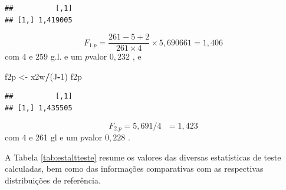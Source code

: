 \documentclass[]{book}
\newenvironment{Shaded}{\begin{snugshade}}{\end{snugshade}}
\newcommand{\DecValTok}[1]{\textcolor[rgb]{0.00,0.00,0.81}{#1}}
\newcommand{\StringTok}[1]{\textcolor[rgb]{0.31,0.60,0.02}{#1}}
\newcommand{\OperatorTok}[1]{\textcolor[rgb]{0.81,0.36,0.00}{\textbf{#1}}}
\newcommand{\NormalTok}[1]{#1}
\theoremstyle{definition}
\theoremstyle{definition}
\theoremstyle{definition}
\theoremstyle{remark}
\begin{document}
\begin{verbatim}
##          [,1]
## [1,] 1,419005
\end{verbatim}

\[
F_{1.p}=\frac{261-5+2}{261\times 4}\times 5,690661=1,406 
\] com \(4\) e \(259\) g.l. e um \(p\)valor \(0,232\) , e

\begin{Shaded}
\begin{Highlighting}[]
\NormalTok{f2p <-}\StringTok{ }\NormalTok{x2w}\OperatorTok{/}\NormalTok{(J}\OperatorTok{-}\DecValTok{1}\NormalTok{)}
\NormalTok{f2p}
\end{Highlighting}
\end{Shaded}

\begin{verbatim}
##          [,1]
## [1,] 1,435505
\end{verbatim}

\[
F_{2.p}=5,691/4\mbox{ }=1,423 
\] com 4 e 261 gl e um \(p\)valor \(0,228\) .

A Tabela \ref{tab:estaltteste} resume os valores das diversas
estatísticas de teste calculadas, bem como das informações comparativas
com as respectivas distribuições de referência.
\end{document}
